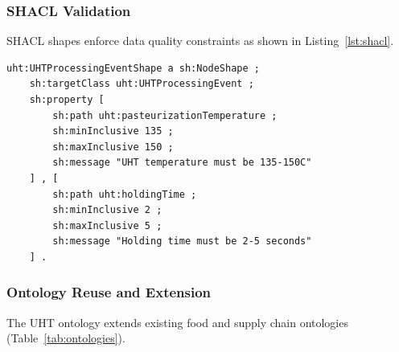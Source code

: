 \documentclass[preprint,review,12pt,authoryear]{elsarticle}
\begin{document}
\subsubsection{SHACL Validation}

SHACL shapes enforce data quality constraints as shown in Listing~\ref{lst:shacl}.

\begin{lstlisting}[caption={SHACL Validation for UHT Processing}, label={lst:shacl}, basicstyle=\ttfamily\scriptsize]
uht:UHTProcessingEventShape a sh:NodeShape ;
    sh:targetClass uht:UHTProcessingEvent ;
    sh:property [
        sh:path uht:pasteurizationTemperature ;
        sh:minInclusive 135 ;
        sh:maxInclusive 150 ;
        sh:message "UHT temperature must be 135-150C"
    ] , [
        sh:path uht:holdingTime ;
        sh:minInclusive 2 ;
        sh:maxInclusive 5 ;
        sh:message "Holding time must be 2-5 seconds"
    ] .
\end{lstlisting}

\subsubsection{Ontology Reuse and Extension}

The UHT ontology extends existing food and supply chain ontologies (Table~\ref{tab:ontologies}).

\begin{table}[htbp]
\centering
\caption{Ontology Reuse and Metrics}
\label{tab:ontologies}
\end{table}
\end{document}
